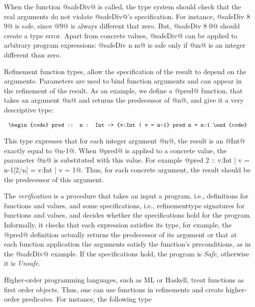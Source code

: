 When the function @safeDiv@ is called, 
the type system should check that the real arguments do not
violate @safeDiv@'s specification.
%
For instance, 
@safeDiv 8 9@ is safe, since @9@ is always different that zero.
But, @safeDiv 8 0@ should create a type error.
Apart from concrete values, @safeDiv@ can be applied to arbitrary program expressions:
@safeDiv n m@ is safe only if 
@m@ is an integer different than zero.

Refinement function types, allow the specification of the 
result to depend on the arguments.
%
Parameters are used to bind function arguments
and can appear in the refinement of the result.
%
As an example, we define a @pred@ function, 
that takes an argument @n@ and returns the predecessor of @n@,
and give it a very descriptive type:

$$\centering\begin{tabular}{c}\begin{code}
pred :: n : Int -> {v:Int | v = n-1}
pred n = n-1
\end{code}\end{tabular}$$

This type expresses that for each integer argument @n@, 
the result is an @Int@ exactly equal to @n-1@.
When @pred@ is applied to a concrete value, 
the parameter @n@ is substituted with this value.
For example @pred 2 :: {v:Int | v = n-1}[2/n] = {v:Int | v = 1}@.
Thus, for each concrete argument, the result should be the predecessor 
of this argument.

The \textit{verification} is a procedure that takes an input 
a program, i.e.,  definitions for functions and values,
and some specifications, i.e., refinementtype signatures for functions and values,
and decides whether the specifications hold for the program.
%
Informally, it checks that 
each expression satisfies its type, 
for example, the @pred@ definition actually returns the 
predecessor of its argument
or that 
at each function application the arguments satisfy
the function's preconditions, 
as in the @safeDiv@ example.
%
If the specifications hold, the program is \textit{Safe}, 
otherwise it is \textit{Unsafe}. 

Higher-order programming languages, such as ML or Haskell, 
treat functions as first order objects.
Thus, one can use functions in refinements and 
create higher-order predicates. 
For instance, the following type

